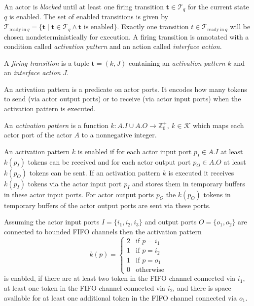 An actor is \emph{blocked} until at least one firing transition
$\mathbf{t} \in \mathcal{T}_q$ for the current state $q$ is enabled.
The set of enabled transitions is given by
$\mathcal{T}_{\mathrm{ready\ in\ }q} = \{ \mathbf{t} \mid \mathbf{t} \in \mathcal{T}_q \wedge \mathbf{t} \textrm{ is enabled}\}$.
Exactly one transition $t \in \mathcal{T}_{\mathrm{ready\ in\ }q}$ will be
chosen nondeterministically for execution.
A firing transition is annotated with a condition called
\emph{activation pattern} and an action called \emph{interface action}.

\begin{definition}\label{firing-transition}
  A \emph{firing transition} is a tuple $\mathbf{t} = (k,J)$ containing
  an \emph{activation pattern} $k$ and an \emph{interface action} $J$.
\end{definition}

An activation pattern is a predicate on actor ports. It encodes how many
tokens to send (via actor output ports) or to receive (via actor input ports)
when the activation pattern is executed.

\begin{definition}\label{activation-pattern}
  An \emph{activation pattern} is a function
  $k: A.I \cup A.O \to \mathbb{Z}^+_0,\ k \in \mathcal{K}$
  which maps each actor port of the actor $A$ to a nonnegative integer.
\end{definition}

An activation pattern $k$ is enabled if for each actor input port
$p_I \in A.I$ at least $k(p_I)$ tokens can be received and for each
actor output port $p_O \in A.O$ at least $k(p_O)$ tokens can be sent.
If an activation pattern $k$ is executed it receives $k(p_I)$ tokens
via the actor input port $p_I$ and stores them in
temporary buffers in these actor input ports. For actor output ports
$p_O$ the $k(p_O)$ tokens in temporary buffers of the actor
output ports are sent via these ports.

\begin{example}\label{ex:example-activation-pattern}
Assuming the actor input ports $I = \{i_1,i_2,i_3\}$ and output ports
$O = \{o_1,o_2\}$ are connected to bounded FIFO channels then the
activation pattern 
\[k(p) = \left\{ \begin{array}{ll}
2 & \textrm{if $p = i_1$} \\
1 & \textrm{if $p = i_2$} \\
1 & \textrm{if $p = o_1$} \\
0 & \textrm{otherwise}
\end{array} \right.\]
is enabled, if there are at least two token in the FIFO channel connected
via $i_1$, at least one token in the FIFO channel connected via $i_2$, and
there is space available for at least one additional token in the FIFO channel
connected via $o_1$.
\end{example}

